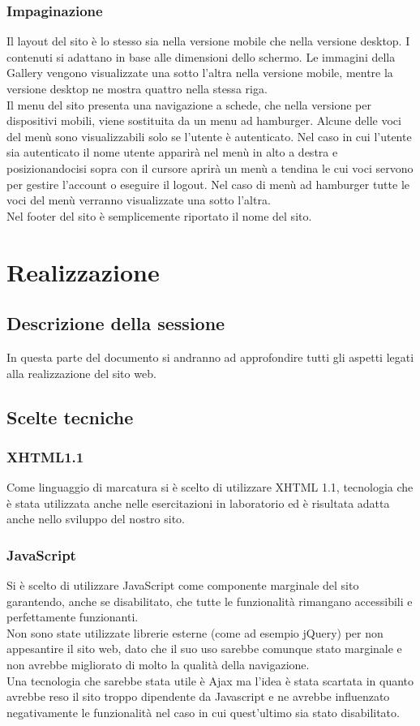 \documentclass[openany, a4paper, 12pt]{report}
\begin{document}
		\subsection{Impaginazione}
		Il layout del sito è lo stesso sia nella versione mobile che nella versione desktop. I contenuti si adattano in base alle dimensioni dello schermo. Le immagini della Gallery vengono visualizzate una sotto l'altra nella versione mobile, mentre la versione desktop ne mostra quattro nella stessa riga.\\
		Il menu del sito presenta una navigazione a schede, che nella versione per dispositivi mobili, viene sostituita da un menu ad hamburger. Alcune delle voci del menù sono visualizzabili solo se l'utente è autenticato. Nel caso in cui l'utente sia autenticato il nome utente apparirà nel menù in alto a destra e posizionandocisi sopra con il cursore aprirà un menù a tendina le cui voci servono per gestire l'account o eseguire il logout. Nel caso di menù ad hamburger tutte le voci del menù verranno visualizzate una sotto l'altra.\\
		Nel footer del sito è semplicemente riportato il nome del sito.

	\chapter{Realizzazione}
		\section{Descrizione della sessione}
		In questa parte del documento si andranno ad approfondire tutti gli aspetti legati alla realizzazione del sito web.

	\section{Scelte tecniche}
		\subsection{XHTML1.1}
		Come linguaggio di marcatura si è scelto di utilizzare XHTML 1.1, tecnologia che è stata utilizzata anche nelle esercitazioni in laboratorio ed è risultata adatta anche nello sviluppo del nostro sito.\\
		
		\subsection{JavaScript}
		Si è scelto di utilizzare JavaScript come componente marginale del sito garantendo, anche se disabilitato, che tutte le funzionalità rimangano accessibili e perfettamente funzionanti.\\
		Non sono state utilizzate librerie esterne (come ad esempio jQuery) per non appesantire il sito web, dato che il suo uso sarebbe comunque stato marginale e non avrebbe migliorato di molto la qualità della navigazione.\\
		Una tecnologia che sarebbe stata utile è Ajax ma l'idea è stata scartata in quanto avrebbe reso il sito troppo dipendente da Javascript e ne avrebbe influenzato negativamente le funzionalità nel caso in cui quest'ultimo sia stato disabilitato.
		
\end{document}
